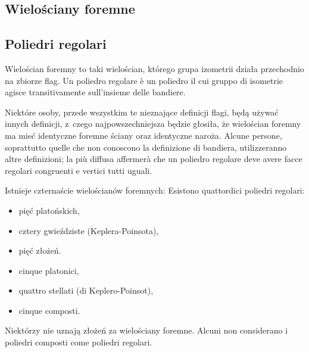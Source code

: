 
%

\subsection{Wielościany foremne} %
\subsection{Poliedri regolari} %

\begin{definition}
    Wielościan foremny to taki wielościan, którego grupa izometrii działa przechodnio na zbiorze flag. %
    Un poliedro regolare è un poliedro il cui gruppo di isometrie agisce transitivamente sull'insieme delle bandiere. %
\end{definition}

Niektóre osoby, przede wszystkim te nieznające definicji flagi, będą używać innych definicji, z~czego najpowszechniejsza będzie głosiła, że wielościan foremny ma mieć identyczne foremne ściany oraz identyczne naroża. %
Alcune persone, soprattutto quelle che non conoscono la definizione di bandiera, utilizzeranno altre definizioni; la più diffusa affermerà che un poliedro regolare deve avere facce regolari congruenti e vertici tutti uguali. %

\begin{proposition}
    Istnieje czternaście wielościanów foremnych: %
    Esistono quattordici poliedri regolari: %
    \begin{itemize}
        \item pięć platońskich, %
        \item cztery gwieździste (Keplera-Poinsota), %
        \item pięć złożeń. %
        \item cinque platonici, %
        \item quattro stellati (di Keplero-Poinsot), %
        \item cinque composti. %
    \end{itemize}
\end{proposition}
Niektórzy nie uznają złożeń za wielościany foremne. %
Alcuni non considerano i poliedri composti come poliedri regolari. %







%